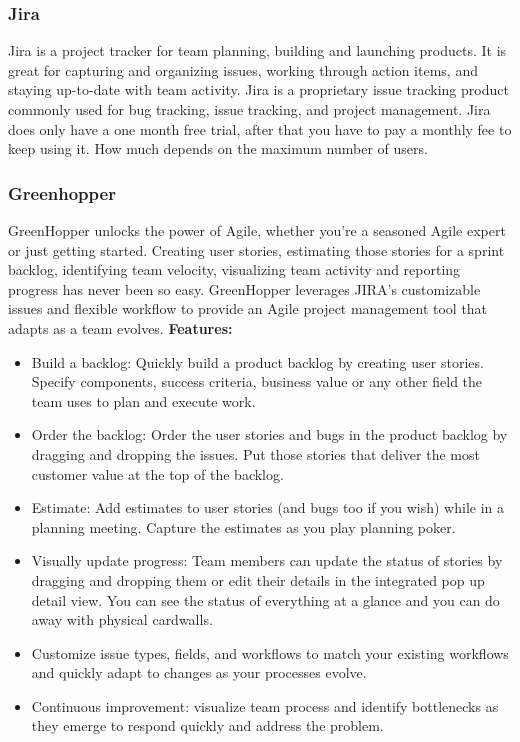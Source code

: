 \subsubsection{Jira}
Jira is a project tracker for team planning, building and launching products. It is great for capturing and organizing issues, working through action items, and staying up-to-date with team activity. Jira is a proprietary issue tracking product commonly used for bug tracking, issue tracking, and project management.
\newline
\newline
Jira does only have a one month free trial, after that you have to pay a monthly fee to keep using it. How much depends on the maximum number of users.

\subsubsection{Greenhopper}
GreenHopper unlocks the power of Agile, whether you're a seasoned Agile expert or just getting started. Creating user stories, estimating those stories for a sprint backlog, identifying team velocity, visualizing team activity and reporting progress has never been so easy.
\newline
\newline
GreenHopper leverages JIRA's customizable issues and flexible workflow to provide an Agile project management tool that adapts as a team evolves.
\newline
\newline
\textbf{Features:}
\begin{itemize}
\item{}Build a backlog: Quickly build a product backlog by creating user stories. Specify components, success criteria, business value or any other field the team uses to plan and execute work.
\item{}Order the backlog: Order the user stories and bugs in the product backlog by dragging and dropping the issues. Put those stories that deliver the most customer value at the top of the backlog.
\item{}Estimate: Add estimates to user stories (and bugs too if you wish) while in a planning meeting. Capture the estimates as you play planning poker.
\item{}Visually update progress: Team members can update the status of stories by dragging and dropping them or edit their details in the integrated pop up detail view. You can see the status of everything at a glance and you can do away with physical cardwalls.
\item{}Customize issue types, fields, and workflows to match your existing workflows and quickly adapt to changes as your processes evolve.
\item{}Continuous improvement: visualize team process and identify bottlenecks as they emerge to respond quickly and address the problem.
\end{itemize}